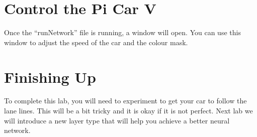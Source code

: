 \documentclass[11pt]{report}
\begin{document}
\section{Control the Pi Car V}
Once the “runNetwork” file is running, a window will open. You can use this window to adjust the speed of the car and the colour mask.

\section{Finishing Up}
To complete this lab, you will need to experiment to get your car to follow the lane lines. This will be a bit tricky and it is okay if it is not perfect. Next lab we will introduce a new layer type that will help you achieve a better neural network.
\end{document}
